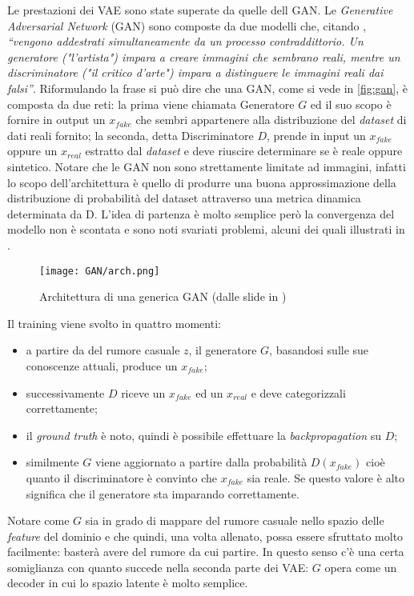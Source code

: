 

Le prestazioni dei VAE sono state superate da quelle dell GAN.
Le \emph{Generative Adversarial Network} (GAN) sono composte da due modelli che, citando \cite{GANTF}, \emph{``vengono addestrati simultaneamente da un processo contraddittorio. Un generatore ("l'artista") impara a creare immagini che sembrano reali, mentre un discriminatore ("il critico d'arte") impara a distinguere le immagini reali dai falsi''}.
Riformulando la frase si può dire che una GAN, come si vede in \autoref{fig:gan}, è composta da due reti: la prima viene chiamata Generatore $G$ ed il suo scopo è fornire in output un $x_{fake}$ che sembri appartenere alla distribuzione del \emph{dataset} di dati reali fornito; la seconda, detta Discriminatore $D$, prende in input un $x_{fake}$ oppure un $x_{real}$ estratto dal \emph{dataset} e deve riuscire determinare se è reale oppure sintetico.
Notare che le GAN non sono strettamente limitate ad immagini, infatti lo scopo dell'architettura è quello di produrre una buona approssimazione della distribuzione di probabilità del dataset attraverso una metrica dinamica determinata da D.
L'idea di partenza è molto semplice però la convergenza del modello non è scontata e sono noti svariati problemi, alcuni dei quali illustrati in \cite{HARD_GAN}.

\begin{figure}[ht]
  \centering
  \texttt{[image: GAN/arch.png]}
  \caption{Architettura di una generica GAN (dalle slide in \cite{MIT_GEN})}
  \label{fig:gan}
\end{figure}
\noindent
Il training viene svolto in quattro momenti:
\begin{itemize}
  \item a partire da del rumore casuale $z$, il generatore $G$, basandosi sulle sue conoscenze attuali, produce un $x_{fake}$;
  \item successivamente $D$ riceve un $x_{fake}$ ed un $x_{real}$ e deve categorizzali correttamente;
  \item il \emph{ground truth} è noto, quindi è possibile effettuare la \emph{backpropagation} su $D$;
  \item similmente $G$ viene aggiornato a partire dalla probabilità $D(x_{fake})$ cioè quanto il discriminatore è convinto che $x_{fake}$ sia reale.
    Se questo valore è alto significa che il generatore sta imparando correttamente.
\end{itemize}
Notare come $G$ sia in grado di mappare del rumore casuale nello spazio delle \emph{feature} del dominio e che quindi, una volta allenato, possa essere sfruttato molto facilmente: basterà avere del rumore da cui partire.
In questo senso c'è una certa somiglianza con quanto succede nella seconda parte dei VAE: $G$ opera come un decoder in cui lo spazio latente è molto semplice.

